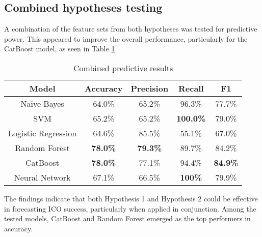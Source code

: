 \documentclass[runningheads]{llncs}
\begin{document}
\subsection{Combined hypotheses testing}
A combination of the feature sets from both hypotheses was tested for predictive power. This appeared to improve the overall performance, particularly for the CatBoost model, as seen in Table \ref{tab8}. 

\begin{table}[htbp]
\caption{Combined predictive results}
\begin{center}
\begin{tabular}{|c|c|c|c|c|}
\hline
\textbf{Model} & \textbf{Accuracy} & \textbf{Precision} & \textbf{Recall} & \textbf{F1} \\
\hline
Naïve Bayes & 64.0\% & 65.2\% & 96.3\% & 77.7\% \\
\hline
SVM & 65.2\% & 65.2\% & \textbf{100.0\%} & 79.0\% \\
\hline
Logistic Regression & 64.6\% & 85.5\% & 55.1\% & 67.0\% \\
\hline
Random Forest & \textbf{78.0\%} & \textbf{79.3\%} & 89.7\% & 84.2\% \\
\hline
CatBoost & \textbf{78.0\%} & 77.1\% & 94.4\% & \textbf{84.9\%} \\
\hline
Neural Network & 67.1\% & 66.5\% & \textbf{100\%} & 79.9\% \\
\hline
\end{tabular}
\label{tab8}
\end{center}
\end{table}


The findings indicate that both Hypothesis 1 and Hypothesis 2 could be effective in forecasting ICO success, particularly when applied in conjunction. Among the tested models, CatBoost and Random Forest emerged as the top performers in accuracy.
\end{document}
